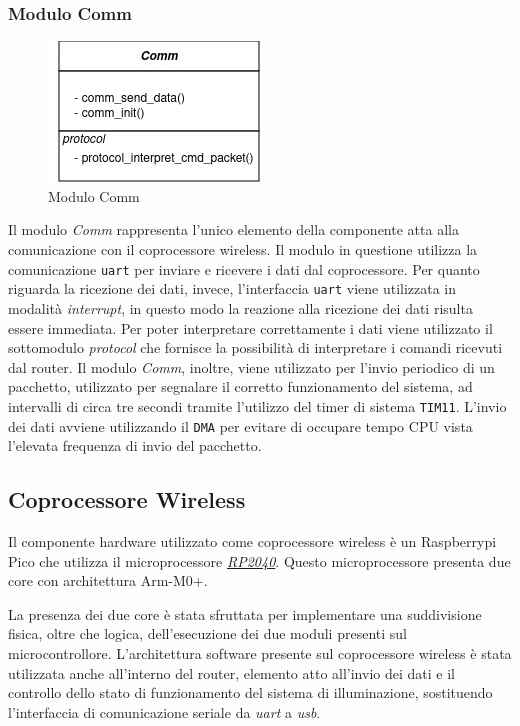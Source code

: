 \documentclass{article}
\begin{document}
	\subsubsection{Modulo Comm}
	\begin{figure}[ht]
		\centering
		\includegraphics[scale=0.5]{./images/Comm.jpg}
		\caption{Modulo Comm}
		\label{img:comm}
	\end{figure}
	\noindent Il modulo \textit{Comm} rappresenta l'unico elemento della componente atta alla comunicazione con il coprocessore wireless.
	Il modulo in questione utilizza la comunicazione \texttt{uart} per inviare e ricevere i dati dal coprocessore.
	Per quanto riguarda la ricezione dei dati, invece, l'interfaccia \texttt{uart} viene utilizzata in modalit\`a \textit{interrupt}, in questo modo la reazione alla ricezione dei dati risulta essere immediata.
	Per poter interpretare correttamente i dati viene utilizzato il sottomodulo \textit{protocol} che fornisce la possibilit\`a di interpretare i comandi ricevuti dal router.
	Il modulo \textit{Comm}, inoltre, viene utilizzato per l'invio periodico di un pacchetto, utilizzato per segnalare il corretto funzionamento del sistema, ad intervalli di circa tre secondi tramite l'utilizzo del timer di sistema \texttt{TIM11}. L'invio dei dati avviene utilizzando il \texttt{DMA} per evitare di occupare tempo CPU vista l'elevata frequenza di invio del pacchetto.
	
	\subsection{Coprocessore Wireless}
	Il componente hardware utilizzato come coprocessore wireless \`e un Raspberrypi Pico che utilizza il microprocessore \href{https://www.raspberrypi.com/documentation/microcontrollers/silicon.html#rp2040}{\textit{RP2040}}. Questo microprocessore presenta due core con architettura Arm-M0+.
	
	\noindent La presenza dei due core \`e stata sfruttata per implementare una suddivisione fisica, oltre che logica, dell'esecuzione dei due moduli presenti sul microcontrollore.
	L'architettura software presente sul coprocessore wireless \`e stata utilizzata anche all'interno del router, elemento atto all'invio dei dati e il controllo dello stato di funzionamento del sistema di illuminazione, sostituendo l'interfaccia di comunicazione seriale da \textit{uart} a \textit{usb}.
	
\end{document}
